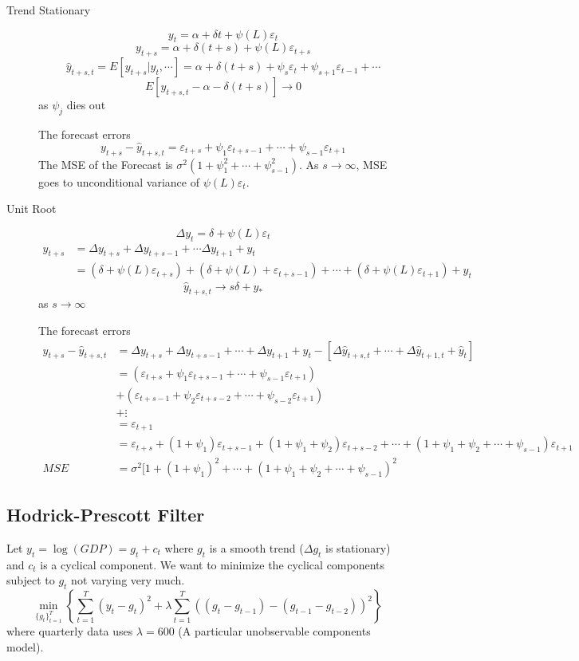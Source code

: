 \documentclass[11pt, a4paper, oneside]{article}
\theoremstyle{definition}
\theoremstyle{proposition}
\theoremstyle{corollary}
\theoremstyle{lemma}
\theoremstyle{theorem}
\begin{document}
\begin{description}
\item[Trend Stationary] $$y_t = \alpha + \delta t + \psi(L)\varepsilon_t$$ 
$$y_{t+s} = \alpha + \delta(t+s) + \psi(L)\varepsilon_{t+s}$$
$$\hat{y}_{t+s, t} = E[y_{t+s}| y_t,\cdots] = \alpha + \delta(t+s) + \psi_s\varepsilon_t + \psi_{s+1}\varepsilon_{t-1} + \cdots$$
$$E[\hat{y}_{t+s, t}  - \alpha - \delta(t+s)] \to0$$ as $\psi_j$ dies out

The forecast errors 
$$y_{t+s} - \hat{y}_{t+s, t} = \varepsilon_{t+s} + \psi_1 \varepsilon_{t+s-1} + \cdots + \psi_{s-1}\varepsilon_{t+1}$$
The MSE of the Forecast is $\sigma^2(1+ \psi_1^2+\cdots +  \psi_{s-1}^2)$. As $s \to \infty$, MSE goes to unconditional variance of $\psi(L)\varepsilon_t$. 
\item[Unit Root] $$\Delta y_t = \delta + \psi(L) \varepsilon_t$$
\begin{align*}
y_{t+s} &= \Delta y_{t+s} +   \Delta y_{t+s-1} + \cdots  \Delta y_{t+1} + y_t\\
&= (\delta + \psi(L) \varepsilon_{t+s}) + (\delta + \psi(L)+ \varepsilon_{t+s-1}) + \cdots + (\delta+\psi(L)\varepsilon_{t+1}) +y_t
\end{align*}
$$\hat{y}_{t+s, t} \to s\delta + y_*$$ as $s \to \infty$

The forecast errors
\begin{align*}
y_{t+s} - \hat{y}_{t+s, t} &= \Delta y_{t+s}+\Delta y_{t+s-1} + \cdots + \Delta y_{t+1}+y_t - [\Delta \hat{y}_{t+s, t} + \cdots+ \Delta \hat{y}_{t+1, t} + \hat{y}_t] \\
&=(\varepsilon_{t+s}+\psi_1 \varepsilon_{t+s-1}+\cdots+\psi_{s-1}\varepsilon_{t+1})\\
&+ (\varepsilon_{t+s-1}+\psi_2 \varepsilon_{t+s-2}+\cdots+\psi_{s-2}\varepsilon_{t+1}) \\
&+ \vdots\\
&=\varepsilon_{t+1} \\ 
&=\varepsilon_{t+s} + (1 + \psi_1)\varepsilon_{t+s-1} + (1 + \psi_1+ \psi_2) \varepsilon_{t+s-2} + \cdots + (1+\psi_1+ \psi_2+\cdots + \psi_{s-1})\varepsilon_{t+1}\\
MSE& = \sigma^2[1 + (1+ \psi_1)^2 + \cdots + (1+\psi_1+ \psi_2+\cdots + \psi_{s-1})^2 
 \end{align*}
\end{description} 

\subsection{Hodrick-Prescott Filter}
Let $y_t =\log(GDP) = g_t + c_t$ where $g_t$ is a smooth trend ($\Delta g_t$ is stationary) and $c_t$ is a cyclical component. We want to minimize the cyclical components subject to $g_t$ not varying very much. 
$$\min_{\{g_t\}^T_{t=1}} \left\{ \sum_{t=1}^T(y_t - g_t)^2 + \lambda \sum_{t=1}^T((g_t - g_{t-1}) -  (g_{t-1} - g_{t-2}))^2\right\}$$
where quarterly data uses $\lambda = 600$ (A particular unobservable components model). 
\end{document}
